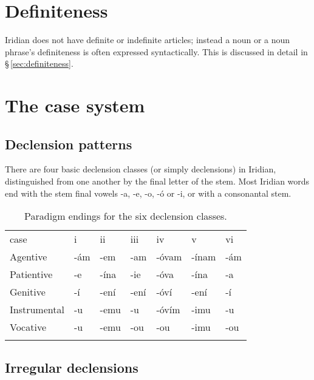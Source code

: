 \section{Definiteness}
Iridian does not have definite or indefinite articles; instead a noun or a noun phrase's definiteness is often expressed syntactically. This is discussed in detail in \S\,\ref{sec:definiteness}.

\section{The case system}

\subsection{Declension patterns}

There are four basic declension classes (or simply declensions) in Iridian, distinguished from one another by the final letter of the stem. Most Iridian words end with the stem final vowels -a, -e, -o, -ó or -i, or with a consonantal stem.


\begin{table}[h]
    \small
    \caption{Paradigm endings for the six declension classes.}
    \medskip
    \begin{tabu} to \textwidth {Y[2]YYYYYY}
    \toprule\addlinespace
            {\sc case}          &{\sc i} &{\sc ii} & {\sc iii} &{\sc iv} &{\sc v} &{\sc vi} \\ \addlinespace
    \midrule\addlinespace
        Agentive    & -ám   & -em     & -am    & -óvam  & -ínam    & -ám\\ \addlinespace
        Patientive  & -e      & -ína  & -ie    & -óva   & -ína     & -a\\ \addlinespace
        Genitive    & -í    & -ení  & -ení & -óví & -ení     & -í\\ \addlinespace
        Instrumental& -u      & -emu    & -u     & -óvím  & -imu       & -u\\ \addlinespace
        Vocative    & -u      & -emu    & -ou    & -ou      & -imu       & -ou\\ \addlinespace
    \bottomrule
    \end{tabu}
\end{table}


\subsection{Irregular declensions}

